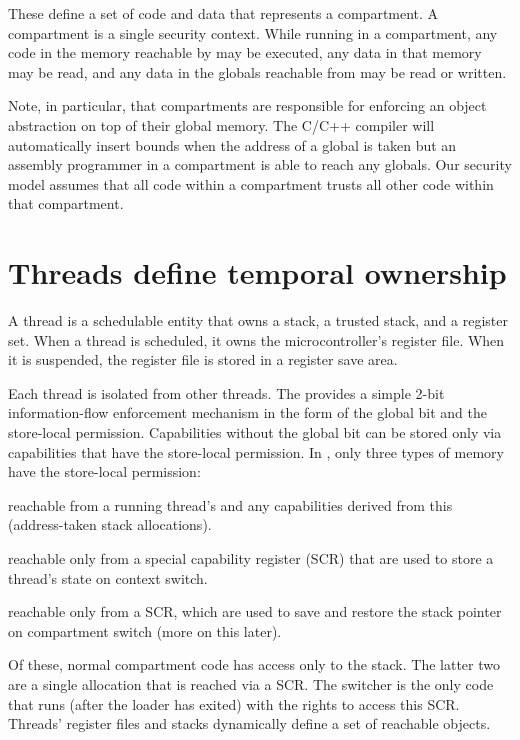 These define a set of code and data that represents a compartment.
A compartment is a single security context.
While running in a compartment, any code in the memory reachable by \PCC{} may be executed, any data in that memory may be read, and any data in the globals reachable from \CGP{} may be read or written.

Note, in particular, that compartments are responsible for enforcing an object abstraction on top of their global memory.
The C/C++ compiler will automatically insert bounds when the address of a global is taken but an assembly programmer in a compartment is able to reach any globals.
Our security model assumes that all code within a compartment trusts all other code within that compartment.

\section{Threads define temporal ownership}

A \cherimcuos{} thread is a schedulable entity that owns a stack, a trusted stack, and a register set.
When a thread is scheduled, it owns the microcontroller's register file.
When it is suspended, the register file is stored in a register save area.

Each thread is isolated from other threads.
The \cherimcuisa{} provides a simple 2-bit information-flow enforcement mechanism in the form of the global bit and the store-local permission.
Capabilities without the global bit can be stored only via capabilities that have the store-local permission.
In \cherimcuos{}, only three types of memory have the store-local permission:

\begin{description}[before={\renewcommand\makelabel[1]{\textbf{##1},}}]
	\item[Stacks] reachable from a running thread's \CSP{} and any capabilities derived from this (address-taken stack allocations).
	\item[Register save areas] reachable only from a special capability register (SCR) that are used to store a thread's state on context switch.
	\item[Trusted stacks] reachable only from a SCR, which are used to save and restore the stack pointer on compartment switch (more on this later).
\end{description}

Of these, normal compartment code has access only to the stack.
The latter two are a single allocation that is reached via a SCR.
The switcher is the only code that runs (after the loader has exited) with the rights to access this SCR.
Threads' register files and stacks dynamically define a set of reachable objects.

